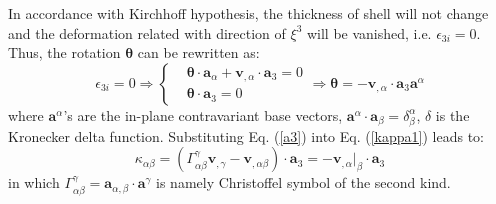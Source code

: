 In accordance with Kirchhoff hypothesis, the thickness of shell will not change and the deformation related with direction of $\xi^3$ will be vanished, i.e. $\epsilon_{3i}=0$. Thus, the rotation $\boldsymbol \theta$ can be rewritten as:
\begin{equation}\label{a3}
\epsilon_{3i} = 0 \Rightarrow
\left \{
\begin{split}
&\boldsymbol \theta \cdot \boldsymbol a_\alpha + \boldsymbol v_{,\alpha} \cdot \boldsymbol a_3 = 0 \\
&\boldsymbol \theta \cdot \boldsymbol a_3 = 0
\end{split}
\right .
\Rightarrow \boldsymbol \theta = - \boldsymbol v_{,\alpha} \cdot \boldsymbol a_3 \boldsymbol a^\alpha
\end{equation}
where $\boldsymbol a^\alpha$'s are the in-plane contravariant base vectors, $\boldsymbol a^\alpha \cdot \boldsymbol a_\beta = \delta^\alpha_\beta$, $\delta$ is the Kronecker delta function. Substituting Eq. (\ref{a3}) into Eq. (\ref{kappa1}) leads to:
\begin{equation}
\kappa_{\alpha\beta} = (\Gamma^\gamma_{\alpha\beta} \boldsymbol v_{,\gamma} - \boldsymbol v_{,\alpha\beta}) \cdot \boldsymbol a_3 = - \boldsymbol v_{,\alpha}\vert_\beta \cdot \boldsymbol a_3
\end{equation}
in which $\Gamma^\gamma_{\alpha\beta} = \boldsymbol a_{\alpha,\beta} \cdot \boldsymbol a^\gamma$ is namely Christoffel symbol of the second kind.
